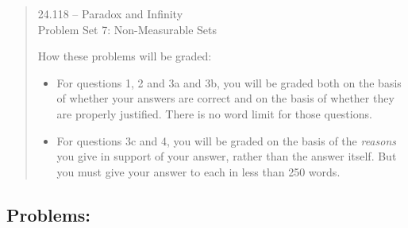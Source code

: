 \documentclass[12pt,a4paper]{article}
\begin{document}
\begin{quote}

\begin{center} {\large 24.118 -- Paradox and Infinity \\ \vspace{1mm}}
 {\large Problem Set 7: Non-Measurable Sets \\ \vspace{1mm}}
 
\end{center}
\vspace{3mm}

\noindent How these problems will be graded:

\begin{itemize} 

\item For questions 1, 2 and 3a and 3b, you will be graded both on the basis of whether your answers are correct and on the basis of whether they are properly justified. There is no word limit for those questions.

\item For questions 3c and 4, you will be graded on the basis of the \emph{reasons} you give in support of your answer, rather than the answer itself. But you must give your
answer to each in less than 250 words.

\end{itemize} 

\end{quote} 


\subsection*{Problems:}
\end{document}
